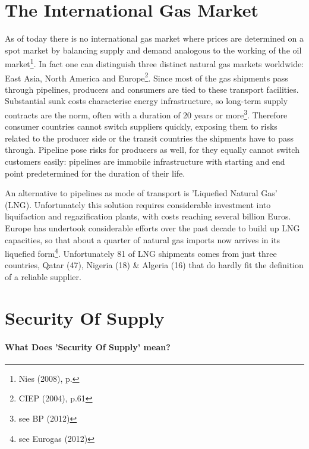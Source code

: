 \documentclass[11pt,a4paper,english]{scrreprt}
\begin{document}
    
    
    
    \section{The International Gas Market}

As of today there is no international gas market where prices are determined on
a spot market by balancing supply and demand analogous to the working of the oil
market\footnote{Nies (2008), p.}. In fact one can distinguish three distinct
natural gas markets worldwide: East Asia, North America and Europe\footnote{CIEP
(2004), p.61}. Since most of the gas shipments pass through pipelines, producers
and consumers are tied to these transport facilities. Substantial sunk costs
characterise energy infrastructure, so long-term supply contracts are the norm,
often with a duration of 20 years or more\footnote{see BP (2012)}. Therefore
consumer countries cannot switch suppliers quickly, exposing them to risks
related to the producer side or the transit countries the shipments have to pass
through. Pipeline pose risks for producers as well, for they equally cannot
switch customers easily: pipelines are immobile infrastructure with starting and
end point predetermined for the duration of their life.\par

An alternative to pipelines as mode of transport is 'Liquefied Natural Gas'
(LNG). Unfortunately this solution requires considerable investment into
liquifaction and regazification plants, with costs reaching several billion
Euros. Europe has undertook considerable efforts over the past decade to
build up LNG capacities, so that about a quarter of natural gas imports now
arrives in its liquefied form\footnote{see Eurogas (2012)}. Unfortunately
81\textdiscount{} of LNG shipments comes from just three countries, Qatar
(47\textdiscount{}), Nigeria (18\textdiscount{}) \& Algeria (16\textdiscount{})
that do hardly fit the definition of a reliable supplier.\par




    \section{Security Of Supply}

	
	\paragraph{What Does 'Security Of Supply' mean?}
\end{document}
